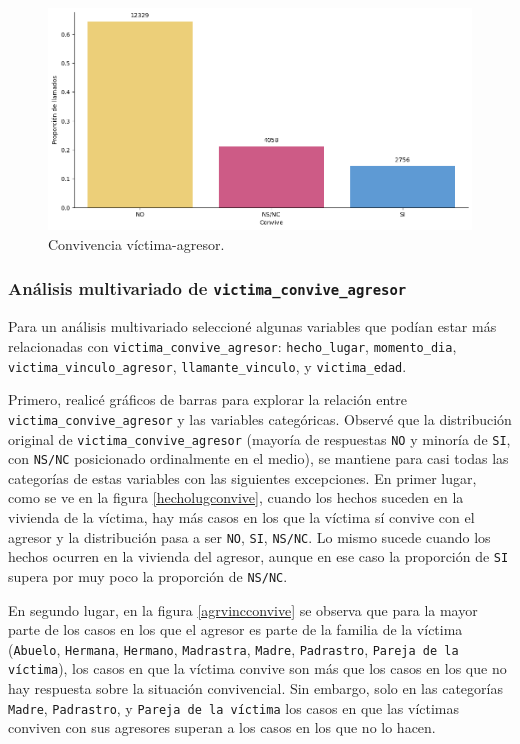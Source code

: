 \documentclass[10 pt]{article}
\begin{document}
\begin{figure}[H]
    \begin{center}
    \includegraphics[scale=.5]{images/latex_convive.png}
    \caption{Convivencia víctima-agresor.}
    \label{convivencia}
    \end{center}
    \end{figure}


\subsubsection{Análisis multivariado de \texttt{victima\_convive\_agresor}}\label{faltantes}


Para un análisis multivariado seleccioné algunas variables que podían estar más relacionadas con 
\texttt{victima\_convive\_agresor}: \texttt{hecho\_lugar}, \texttt{momento\_dia}, \texttt{victima\_vinculo\_agresor}, \texttt{llamante\_vinculo}, y \texttt{victima\_edad}. 

Primero, realicé gráficos de barras para explorar la relación entre \texttt{victima\_convive\_agresor} y las variables categóricas.
Observé que la distribución original de \texttt{victima\_convive\_agresor} (mayoría de respuestas \texttt{NO} y minoría de \texttt{SI}, con \texttt{NS/NC} posicionado ordinalmente en el medio), se mantiene para casi todas las categorías de estas variables con las siguientes excepciones. En primer lugar, como se ve en la figura \ref{hecholugconvive}, cuando los hechos suceden en la vivienda de la víctima, hay más casos en los que la víctima sí convive con el agresor y la distribución pasa a ser \texttt{NO}, \texttt{SI}, \texttt{NS/NC}. Lo mismo sucede cuando los hechos ocurren en la vivienda del agresor, aunque en ese caso la proporción de \texttt{SI} supera por muy poco la proporción de \texttt{NS/NC}. 

En segundo lugar, en la figura \ref{agrvincconvive} se observa que para la mayor parte de los casos en los que el agresor es parte de la familia de la víctima (\texttt{Abuelo}, \texttt{Hermana}, \texttt{Hermano}, \texttt{Madrastra}, \texttt{Madre}, \texttt{Padrastro}, \texttt{Pareja de la víctima}), los casos en que la víctima convive son más que los casos en los que no hay respuesta sobre la situación convivencial. Sin embargo, solo en las categorías \texttt{Madre}, \texttt{Padrastro}, y \texttt{Pareja de la víctima} los casos en que las víctimas conviven con sus agresores superan a los casos en los que no lo hacen.
\end{document}
